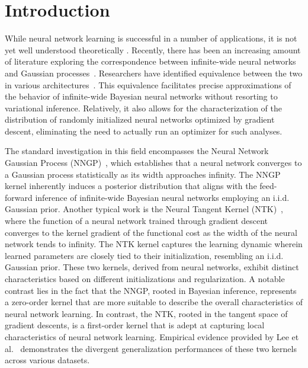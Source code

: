 \documentclass[review,10pt]{JMtemplate}
\begin{document}

\section{Introduction}  \label{sec:introduction}
While neural network learning is successful in a number of applications, it is not yet well understood theoretically \citep{poggio2020theoretical}. Recently, there has been an increasing amount of literature exploring the correspondence between infinite-wide neural networks and Gaussian processes~\citep{neal1996:GP}. Researchers have identified equivalence between the two in various architectures~\citep{garriga2019:GP,novak2018:GP,yang2019:GP}. This equivalence facilitates precise approximations of the behavior of infinite-wide Bayesian neural networks without resorting to variational inference. Relatively, it also allows for the characterization of the distribution of randomly initialized neural networks optimized by gradient descent, eliminating the need to actually run an optimizer for such analyses. 


The standard investigation in this field encompasses the Neural Network Gaussian Process (NNGP)~\citep{lee2018:NNGP}, which establishes that a neural network converges to a Gaussian process statistically as its width approaches infinity. The NNGP kernel inherently induces a posterior distribution that aligns with the feed-forward inference of infinite-wide Bayesian neural networks employing an i.i.d. Gaussian prior. Another typical work is the Neural Tangent Kernel (NTK)~\citep{jacot2018:NTK}, where the function of a neural network trained through gradient descent converges to the kernel gradient of the functional cost as the width of the neural network tends to infinity. The NTK kernel captures the learning dynamic wherein learned parameters are closely tied to their initialization, resembling an i.i.d. Gaussian prior. These two kernels, derived from neural networks, exhibit distinct characteristics based on different initializations and regularization. A notable contrast lies in the fact that the NNGP, rooted in Bayesian inference, represents a zero-order kernel that are more suitable to describe the overall characteristics of neural network learning. In contrast, the NTK, rooted in the tangent space of gradient descents, is a first-order kernel that is adept at capturing local characteristics of neural network learning. Empirical evidence provided by Lee et al.~\citep{lee2020finite} demonstrates the divergent generalization performances of these two kernels across various datasets.
\end{document}
